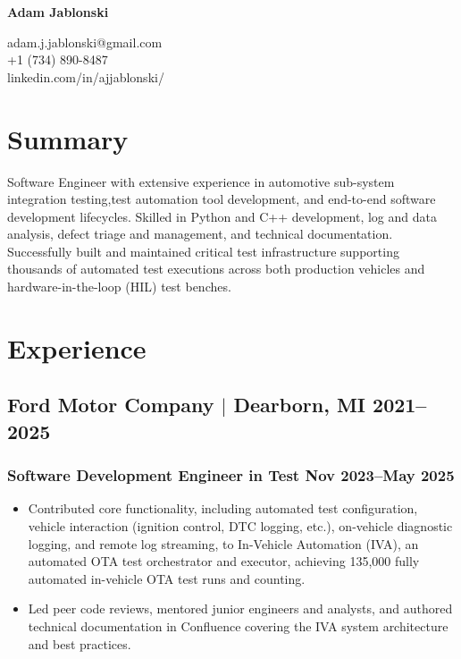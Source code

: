 \documentclass[10pt]{article}
\begin{document}
\pagestyle{empty}

\begin{center}
  \begin{minipage}{0.45\textwidth}
    {\Huge\bfseries
      Adam Jablonski
    }
  \end{minipage} \hfill
  \begin{minipage}{0.5\textwidth}
    \raggedleft
    adam.j.jablonski@gmail.com \\
    +1 (734) 890-8487 \\
    linkedin.com/in/ajjablonski/
  \end{minipage}
\end{center}

\section{Summary}
\noindent 
Software Engineer with extensive experience in automotive sub-system 
integration testing,test automation tool development, and end-to-end software 
development lifecycles. Skilled in Python and C++ development, log and data 
analysis, defect triage and management, and technical documentation. 
Successfully built and maintained critical test infrastructure supporting 
thousands of automated test executions across both production vehicles and 
hardware-in-the-loop (HIL) test benches.

\section{Experience}
\subsection{Ford Motor Company $|$ {\normalfont Dearborn, MI} \hfill 2021--2025}
\vspace*{0.05in}
\subsubsection{Software Development Engineer in Test \hfill Nov 2023--May 2025}
\begin{itemize}
  \item Contributed core functionality, including automated test configuration,
  vehicle interaction (ignition control, DTC logging, etc.), on-vehicle 
  diagnostic logging, and remote log streaming, to In-Vehicle Automation (IVA), 
  an automated OTA test orchestrator and executor, achieving 135,000 fully 
  automated in-vehicle OTA test runs and counting.
  \item Led peer code reviews, mentored junior engineers and analysts, and 
  authored technical documentation in Confluence covering the IVA system 
  architecture and best practices.
\end{itemize}
\vspace*{0.05in}
\end{document}
